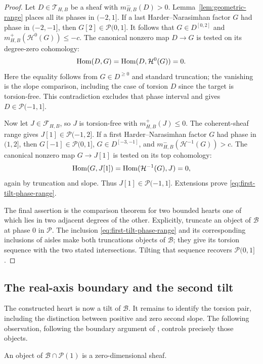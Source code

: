 \begin{proof}
Let $D\in\mathcal T_{H,B}$ be a sheaf with $m^-_{H,B}(D)>0$.
Lemma~\ref{lem:geometric-range} places all its phases in $(-2,1]$.
If a last Harder--Narasimhan factor $G$ had phase in $(-2,-1]$, then
$G[2]\in\mathcal P(0,1]$.  It follows that $G\in D^{[0,2]}$ and
$m^+_{H,B}(\mathcal H^0(G))\le-c$.  The canonical nonzero map $D\to G$
is tested on its degree-zero cohomology:
\[
 \operatorname{Hom}(D,G)=\operatorname{Hom}(D,\mathcal H^0(G))=0.
\]
Here the equality follows from $G\in D^{\ge0}$ and standard truncation;
the vanishing is the slope comparison, including the case of torsion $D$
since the target is torsion-free.  This contradiction excludes that phase
interval and gives $D\in\mathcal P(-1,1]$.

Now let $J\in\mathcal F_{H,B}$, so $J$ is torsion-free with
$m^+_{H,B}(J)\le0$.  The coherent-sheaf range gives
$J[1]\in\mathcal P(-1,2]$.  If a first Harder--Narasimhan factor $G$
had phase in $(1,2]$, then $G[-1]\in\mathcal P(0,1]$,
$G\in D^{[-3,-1]}$, and
$m^-_{H,B}(\mathcal H^{-1}(G))>c$.
The canonical nonzero map $G\to J[1]$ is tested on its top cohomology:
\[
 \operatorname{Hom}(G,J[1])=\operatorname{Hom}(\mathcal H^{-1}(G),J)=0,
\]
again by truncation and slope.  Thus $J[1]\in\mathcal P(-1,1]$.
Extensions prove \eqref{eq:first-tilt-phase-range}.

The final assertion is the comparison theorem for two bounded hearts one
of which lies in two adjacent degrees of the other.  Explicitly, truncate
an object of $\mathcal B$ at phase $0$ in $\mathcal P$.
The inclusion \eqref{eq:first-tilt-phase-range} and its corresponding
inclusions of aisles make both truncations objects of $\mathcal B$;
they give its torsion sequence with the two stated intersections.
Tilting that sequence recovers $\mathcal P(0,1]$.
\end{proof}

\subsection{The real-axis boundary and the second tilt}

The constructed heart is now a tilt of $\mathcal B$.  It remains to
identify the torsion pair, including the distinction between positive
and zero second slope.  The following observation, following the boundary argument of
\cite[Lemma~3.6]{ChengFeyzbakhsh2026}, controls precisely those objects.

\begin{lemma}\label{lem:phase-one-first-tilt}
An object of $\mathcal B\cap\mathcal P(1)$ is a zero-dimensional sheaf.
\end{lemma}

